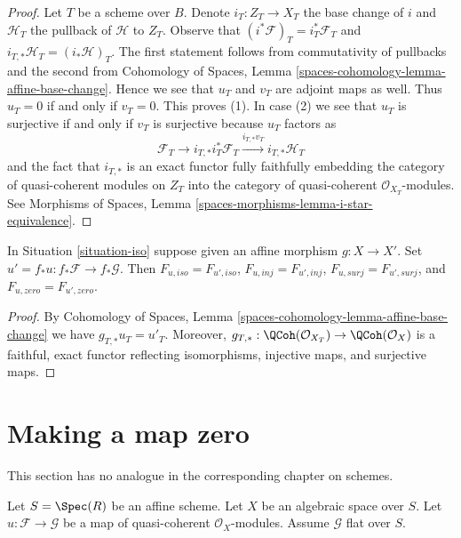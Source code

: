 \begin{proof}
Let $T$ be a scheme over $B$. Denote $i_T : Z_T \to X_T$
the base change of $i$ and $\mathcal{H}_T$ the pullback of $\mathcal{H}$
to $Z_T$. Observe that $(i^*\mathcal{F})_T = i_T^*\mathcal{F}_T$
and $i_{T, *}\mathcal{H}_T = (i_*\mathcal{H})_T$.
The first statement follows from commutativity of pullbacks
and the second from Cohomology of Spaces, Lemma
\ref{spaces-cohomology-lemma-affine-base-change}.
Hence we see that $u_T$ and $v_T$ are adjoint maps as well.
Thus $u_T = 0$ if and only if $v_T = 0$. This proves (1).
In case (2) we see that $u_T$ is surjective if and only if
$v_T$ is surjective because $u_T$ factors as
$$
\mathcal{F}_T \to
i_{T, *}i_T^*\mathcal{F}_T \xrightarrow{i_{T, *}v_T} i_{T, *}\mathcal{H}_T
$$
and the fact that $i_{T, *}$ is an exact functor
fully faithfully embedding the category of quasi-coherent modules on
$Z_T$ into the category of quasi-coherent $\mathcal{O}_{X_T}$-modules.
See Morphisms of Spaces, Lemma \ref{spaces-morphisms-lemma-i-star-equivalence}.
\end{proof}

\begin{lemma}
\label{lemma-relate-zero-affine-push}
In Situation \ref{situation-iso} suppose given an affine morphism
$g : X \to X'$. Set $u' = f_*u : f_*\mathcal{F} \to f_*\mathcal{G}$.
Then $F_{u, iso} = F_{u', iso}$, $F_{u, inj} = F_{u', inj}$,
$F_{u, surj} = F_{u', surj}$, and $F_{u, zero} = F_{u', zero}$.
\end{lemma}

\begin{proof}
By Cohomology of Spaces, Lemma
\ref{spaces-cohomology-lemma-affine-base-change}
we have $g_{T, *}u_T = u'_T$.
Moreover, $g_{T, *} : \QCoh(\mathcal{O}_{X_T}) \to \QCoh(\mathcal{O}_X)$
is a faithful, exact functor reflecting isomorphisms, injective maps,
and surjective maps.
\end{proof}











\section{Making a map zero}
\label{section-zero-map}

\noindent
This section has no analogue in the corresponding chapter on schemes.

\begin{situation}
\label{situation-somewhat-closed}
Let $S = \Spec(R)$ be an affine scheme. Let $X$ be an algebraic space over
$S$. Let $u : \mathcal{F} \to \mathcal{G}$ be a map of quasi-coherent
$\mathcal{O}_X$-modules. Assume $\mathcal{G}$ flat over $S$.
\end{situation}


